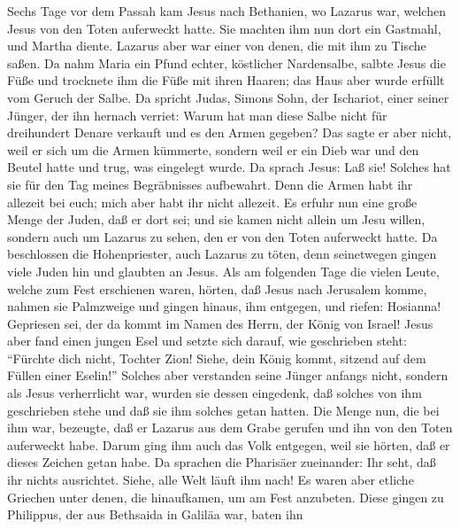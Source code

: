  Sechs Tage vor dem Passah kam Jesus nach Bethanien, wo
Lazarus war, welchen Jesus von den Toten auferweckt hatte.
 Sie machten ihm nun dort ein Gastmahl, und Martha diente.
Lazarus aber war einer von denen, die mit ihm zu Tische saßen.
 Da nahm Maria ein Pfund echter, köstlicher Nardensalbe,
salbte Jesus die Füße und trocknete ihm die Füße mit ihren Haaren; das
Haus aber wurde erfüllt vom Geruch der Salbe.  Da spricht
Judas, Simons Sohn, der Ischariot, einer seiner Jünger, der ihn hernach
verriet:  Warum hat man diese Salbe nicht für dreihundert
Denare verkauft und es den Armen gegeben?  Das sagte er
aber nicht, weil er sich um die Armen kümmerte, sondern weil er ein Dieb
war und den Beutel hatte und trug, was eingelegt wurde. 
Da sprach Jesus: Laß sie! Solches hat sie für den Tag meines
Begräbnisses aufbewahrt.  Denn die Armen habt ihr allezeit
bei euch; mich aber habt ihr nicht allezeit.  Es erfuhr
nun eine große Menge der Juden, daß er dort sei; und sie kamen nicht
allein um Jesu willen, sondern auch um Lazarus zu sehen, den er von den
Toten auferweckt hatte.  Da beschlossen die
Hohenpriester, auch Lazarus zu töten,  denn seinetwegen
gingen viele Juden hin und glaubten an Jesus.  Als am
folgenden Tage die vielen Leute, welche zum Fest erschienen waren,
hörten, daß Jesus nach Jerusalem komme,  nahmen sie
Palmzweige und gingen hinaus, ihm entgegen, und riefen: Hosianna!
Gepriesen sei, der da kommt im Namen des Herrn, der König von Israel!
 Jesus aber fand einen jungen Esel und setzte sich
darauf, wie geschrieben steht:  ``Fürchte dich nicht,
Tochter Zion! Siehe, dein König kommt, sitzend auf dem Füllen einer
Eselin!''  Solches aber verstanden seine Jünger anfangs
nicht, sondern als Jesus verherrlicht war, wurden sie dessen eingedenk,
daß solches von ihm geschrieben stehe und daß sie ihm solches getan
hatten.  Die Menge nun, die bei ihm war, bezeugte, daß er
Lazarus aus dem Grabe gerufen und ihn von den Toten auferweckt habe.
 Darum ging ihm auch das Volk entgegen, weil sie hörten,
daß er dieses Zeichen getan habe.  Da sprachen die
Pharisäer zueinander: Ihr seht, daß ihr nichts ausrichtet. Siehe, alle
Welt läuft ihm nach!  Es waren aber etliche Griechen
unter denen, die hinaufkamen, um am Fest anzubeten. 
Diese gingen zu Philippus, der aus Bethsaida in Galiläa war, baten ihn

